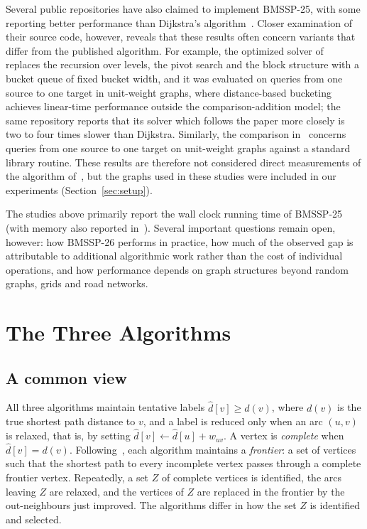 \documentclass[conference,a4paper]{IEEEtran}
\newcommand{\dhat}{\widehat{d}}
\newcommand{\bmA}{BMSSP-25}
\newcommand{\bmB}{BMSSP-26}
\begin{document}
Several public repositories have also claimed to implement \bmA, with some reporting better
performance than Dijkstra's algorithm~\cite{ryu2025,webb2025}. Closer examination of their source
code, however, reveals that these results often concern variants that differ from the published
algorithm. For example, the optimized solver of~\cite{ryu2025} replaces the recursion over
levels, the pivot search and the block structure with a bucket queue of fixed bucket width, and
it was evaluated on queries from one source to one target in unit-weight graphs, where distance-based
bucketing achieves linear-time performance outside the comparison-addition model; the same
repository reports that its solver which follows the paper more closely is two to four times
slower than Dijkstra. Similarly, the comparison in~\cite{webb2025} concerns queries from one
source to one target on unit-weight graphs against a standard library routine. These results are therefore not
considered direct measurements of the algorithm of~\cite{duan2025}, but the graphs used in these
studies were included in our experiments (Section~\ref{sec:setup}).

The studies above primarily report the wall clock running time of \bmA{} (with memory also
reported in~\cite{castro2025}). Several important questions remain open, however: how \bmB{}
performs in practice, how much of the observed gap is attributable to additional algorithmic work
rather than the cost of individual operations, and how performance depends on graph structures
beyond random graphs, grids and road networks.

\section{The Three Algorithms}\label{sec:theory}
\subsection{A common view}
All three algorithms maintain tentative labels $\dhat[v]\ge d(v)$, where $d(v)$ is the true
shortest path distance to $v$, and a label is reduced only when an arc $(u,v)$ is relaxed, that
is, by setting $\dhat[v]\leftarrow\dhat[u]+w_{uv}$. A vertex is \emph{complete} when
$\dhat[v]=d(v)$. Following~\cite{duan2026}, each algorithm maintains a \emph{frontier}: a set of
vertices such that the shortest path to every incomplete vertex passes through a complete
frontier vertex. Repeatedly, a set $Z$ of complete vertices is identified, the arcs leaving $Z$
are relaxed, and the vertices of $Z$ are replaced in the frontier by the out-neighbours just
improved. The algorithms differ in how the set $Z$ is identified and selected.
\end{document}
